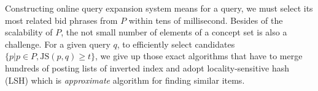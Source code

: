

Constructing online query expansion system means for a query, we must
select its most related bid phrases from $P$ within tens of
millisecond.  Besides of the scalability of $P$, the not small number
of elements of a concept set is also a challenge.  For a given query
$q$, to efficiently select candidates $\{p\vert p\in
P,\text{JS}(p,q)\geq t\}$, we give up those exact algorithms that have
to merge hundreds of posting lists of inverted index and adopt
locality-sensitive hash (LSH) which is \emph{approximate} algorithm
for finding similar items.

